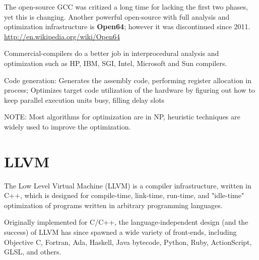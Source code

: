 \begin{itemize}
  The open-source GCC was critized a long time for lacking the first two phases,
  yet this is changing. Another powerful open-source with full analysis and
  optimization infrastructure is {\bf Open64}; however it was discontinued since
  2011. \url{http://en.wikipedia.org/wiki/Open64}
  
  Commercial-compilers do a better job in interprocedural analysis and
  optimization such as HP, IBM, SGI, Intel, Microsoft and Sun compilers.
  
  Code generation: Generates the assembly code, performing register allocation
  in process; Optimizes target code utilization of the hardware by figuring out
  how to keep parallel execution units busy, filling delay slots
  
  NOTE: Most algorithms for optimization are in NP, heuristic techniques are
  widely used to improve the optimization.
\end{itemize}


\section{LLVM}
\label{sec:LLVM}

The Low Level Virtual Machine (LLVM) is a compiler infrastructure, written in
C++, which is designed for compile-time, link-time, run-time, and "idle-time"
optimization of programs written in arbitrary programming languages.

Originally implemented for C/C++, the language-independent design (and the
success) of LLVM has since spawned a wide variety of front-ends, including Objective C, Fortran, Ada, Haskell, Java bytecode, Python, Ruby, ActionScript, GLSL, and others.
